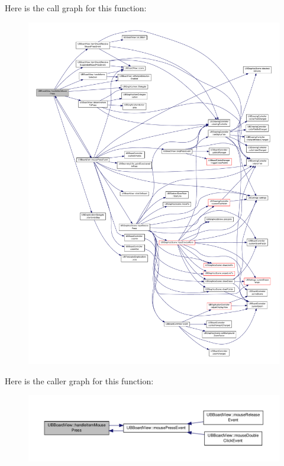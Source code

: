 Here is the call graph for this function\-:
\nopagebreak
\begin{figure}[H]
\begin{center}
\leavevmode
\includegraphics[width=350pt]{d1/d78/class_u_b_board_view_a1818c4d69a09adc9bb98079d2210564d_cgraph}
\end{center}
\end{figure}




Here is the caller graph for this function\-:
\nopagebreak
\begin{figure}[H]
\begin{center}
\leavevmode
\includegraphics[width=350pt]{d1/d78/class_u_b_board_view_a1818c4d69a09adc9bb98079d2210564d_icgraph}
\end{center}
\end{figure}


